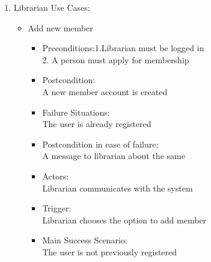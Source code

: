 \documentclass[a4paper]{article}
\begin{document}
\begin{enumerate}
\begin{itemize}
\begin{itemize}
\end{itemize}	 
 
 \end{itemize}
 


\item Librarian Use Cases:
\begin{itemize}
 \item Add new member
 \begin{itemize}
  \item Preconditions:1.Librarian must be logged in\\2. A person must apply for membership
 \\ \item Postcondition:\\A new member account is created \\
 \item Failure Situations:\\ The user is already registered\\
 \item Postcondition in case of failure:\\A message to librarian about the same\\
\item  Actors:\\ Librarian communicates with the system\\
 \item Trigger: \\Librarian  chooses the option to add member\\
 \item Main Success Scenario:\\ The user is not previously registered\\
 \end{itemize}


\end{itemize}
\end{enumerate}
\end{document}
